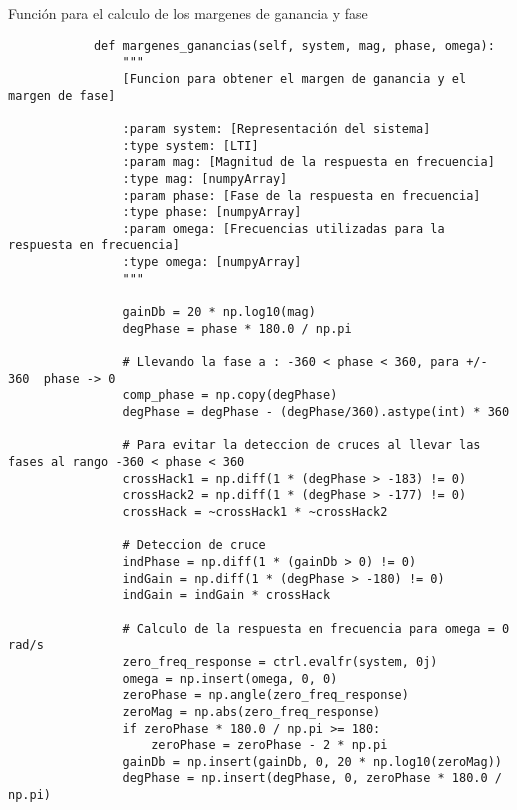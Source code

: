     \begin{longlisting}
        \caption{Función para el calculo de los margenes de ganancia y fase}
        \label{code:1}				
        \begin{verbatim}
            def margenes_ganancias(self, system, mag, phase, omega):
                """
                [Funcion para obtener el margen de ganancia y el margen de fase]
                
                :param system: [Representación del sistema]
                :type system: [LTI]
                :param mag: [Magnitud de la respuesta en frecuencia]
                :type mag: [numpyArray]
                :param phase: [Fase de la respuesta en frecuencia]
                :type phase: [numpyArray]
                :param omega: [Frecuencias utilizadas para la respuesta en frecuencia]
                :type omega: [numpyArray]
                """

                gainDb = 20 * np.log10(mag)
                degPhase = phase * 180.0 / np.pi

                # Llevando la fase a : -360 < phase < 360, para +/- 360  phase -> 0
                comp_phase = np.copy(degPhase)
                degPhase = degPhase - (degPhase/360).astype(int) * 360

                # Para evitar la deteccion de cruces al llevar las fases al rango -360 < phase < 360
                crossHack1 = np.diff(1 * (degPhase > -183) != 0)
                crossHack2 = np.diff(1 * (degPhase > -177) != 0)
                crossHack = ~crossHack1 * ~crossHack2

                # Deteccion de cruce
                indPhase = np.diff(1 * (gainDb > 0) != 0)
                indGain = np.diff(1 * (degPhase > -180) != 0)
                indGain = indGain * crossHack

                # Calculo de la respuesta en frecuencia para omega = 0 rad/s
                zero_freq_response = ctrl.evalfr(system, 0j)
                omega = np.insert(omega, 0, 0)
                zeroPhase = np.angle(zero_freq_response)
                zeroMag = np.abs(zero_freq_response)
                if zeroPhase * 180.0 / np.pi >= 180:
                    zeroPhase = zeroPhase - 2 * np.pi
                gainDb = np.insert(gainDb, 0, 20 * np.log10(zeroMag))
                degPhase = np.insert(degPhase, 0, zeroPhase * 180.0 / np.pi)


\end{verbatim}
\end{longlisting}
